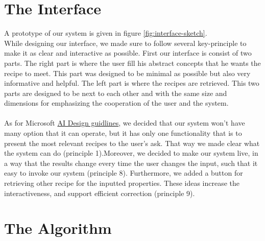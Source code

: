 \documentclass[]{article}
\begin{document}
\section{The Interface}
A prototype of our system is given in figure \ref{fig:interface-sketch}.\\
While designing our interface, we made sure to follow several key-principle to make it as clear and interactive as possible.
First our interface is consist of two parts. The right part is where the user fill his abstract concepts that he wants the recipe to meet. This part was designed to be minimal as possible but also very informative and helpful. The left part is where the recipes are retrieved. This two parts are designed to be next to each other and with the same size and dimensions for emphasizing the cooperation of the user and the system.\\\\
As for Microsoft \href{https://www.microsoft.com/en-us/haxtoolkit/uploads/prod/2021/05/AI-Design-guidelines_041519.pdf}{AI Design guidlines}, we decided that our system won't have many option that it can operate, but it has only one functionality that is to present the most relevant recipes to the user's ask. That way we made clear what the system can do (principle 1).Moreover, we decided to make our system live, in a way that the results change every time the user changes the input, such that it easy to invoke our system (principle 8). Furthermore, we added a button for retrieving other recipe for the inputted properties. These ideas increase the interactiveness, and support efficient correction (principle 9). 

\section{The Algorithm}
\end{document}
